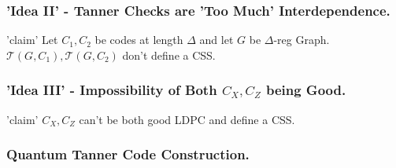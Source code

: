 \documentclass[usenames, aspectratio=169]{beamer}
\theoremstyle{claim}
\theoremstyle{remark}
\begin{document}
\begin{frame}
  \frametitle{ 'Idea II' - Tanner Checks are 'Too Much' Interdependence.}
  \begin{block}{'claim'}
    Let $C_{1}, C_{2}$ be codes at length $\Delta$ and let $G$ be $\Delta$-reg Graph. $\mathcal{T}\left(G, C_{1} \right),\mathcal{T}\left(G, C_{2} \right)$ don't define a CSS. 
  \end{block}
\end{frame}

\begin{frame}
  \frametitle{ 'Idea III' - Impossibility of Both $C_{X},C_{Z}$ being Good.}
  \begin{block}{'claim'}
    $C_{X},C_{Z}$ can't be both good LDPC and define a CSS.  
  \end{block}
\end{frame}

\begin{frame}
  \frametitle{Quantum Tanner Code Construction.}



\end{frame}
\end{document}
